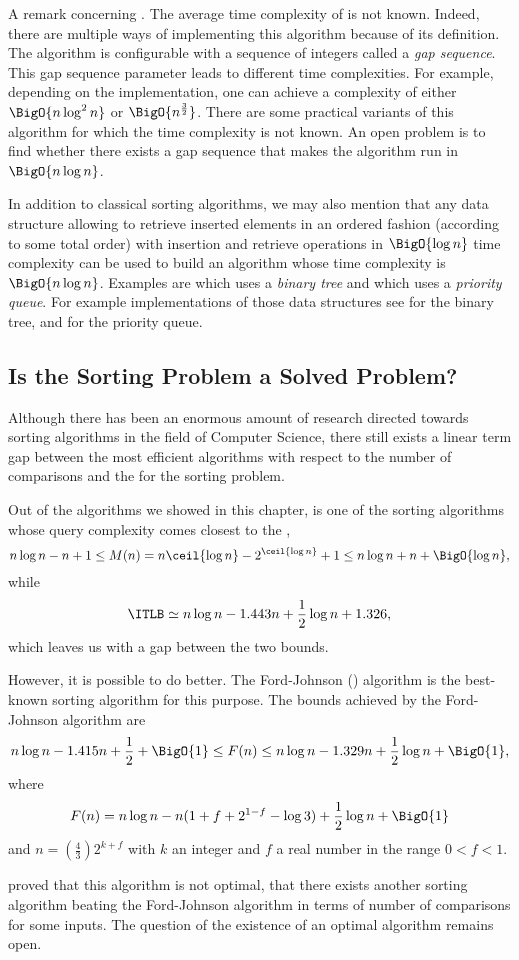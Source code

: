 A remark concerning \shellsort. The average time complexity of \shellsort is not
known. Indeed, there are multiple ways of implementing this
algorithm because of its definition. The \shellsort algorithm is configurable
with a sequence of integers called a \emph{gap sequence}. This gap sequence
parameter leads to different time complexities. For example, depending on the
implementation, one can achieve a complexity of either $\BigO{n \log^2 n}$ or
$\BigO{n^{\frac{3}{2}}}$. There are some practical variants of this algorithm
for which the time complexity is not known. An open problem is to find whether
there exists a gap sequence that makes the algorithm run in $\BigO{n \log
n}$.

In addition to classical sorting algorithms, we may also mention that any data
structure allowing to retrieve inserted elements in an ordered fashion
(according to some total order) with insertion and retrieve operations in
$\BigO{\log n}$ time complexity can be used to build an algorithm whose time
complexity is $\BigO{n \log n}$. Examples are
\binarytreesort which uses a \emph{binary tree} and
\tournamentsort which uses a \emph{priority queue}.
For example implementations of those data structures see
\citet*{sleator:1985} for the binary tree, and
\citet*{leiserson:2001} for the priority queue.


\subsection{Is the Sorting Problem a Solved Problem?}
Although there has been an enormous amount of research directed towards sorting
algorithms in the field of Computer Science, there still exists a linear term
gap between the most efficient algorithms with respect to the number of
comparisons and the \concept{\ITLB} for the sorting problem.

Out of the algorithms we showed in this chapter, \mergesort is one of the
sorting algorithms whose query complexity comes closest
to the \concept{\ITLB}, \ie
\begin{displaymath}
n \log n - n + 1 \le M(n) = n \ceil{\log n} - 2^{\ceil{\log n}} + 1 \le n \log
n + n + \BigO{\log n},
\end{displaymath}
while
\begin{displaymath}
\ITLB \simeq n \log n - 1.443 n + \frac{1}{2} \log n + 1.326,
\end{displaymath}
which leaves us with a  gap between the two bounds.

However, it is possible to do better. The Ford-Johnson
(\cite{ford:1959,hwang:1969,knuth1998art}) algorithm is the
best-known sorting algorithm for this purpose. The bounds achieved by the
Ford-Johnson algorithm are
\begin{displaymath}
n \log n - 1.415 n + \frac{1}{2} + \BigO{1} \le F(n) \le n \log n - 1.329 n +
\frac{1}{2} \log n + \BigO{1},
\end{displaymath}
where
\begin{displaymath}
F(n) = n \log n - n ( 1 + f + 2^{1-f} - \log 3) + \frac{1}{2} \log n + \BigO{1}
\end{displaymath}
and \(n = \left(\frac{4}{3}\right) 2^{k+f}\) with \(k\) an integer and \(f\) a real
number in the range \(0 < f < 1\).

\citet*{manacher:1979} proved that this algorithm is not optimal, \ie that
there exists another sorting algorithm beating the Ford-Johnson algorithm in
terms of number of comparisons for some inputs. The question of the existence
of an optimal algorithm remains open.
